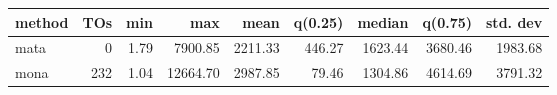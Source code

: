 \begin{tabular}{lrrrrrrrr}
\hline
 method   &    TOs &   min &      max &    mean &   q(0.25) &   median &   q(0.75) &   std. dev \\
\hline
 mata     &   0 &  1.79 &  7900.85 & 2211.33 &    446.27 &  1623.44 &   3680.46 &    1983.68 \\
 mona     & 232 &  1.04 & 12664.70 & 2987.85 &     79.46 &  1304.86 &   4614.69 &    3791.32 \\
\hline
\end{tabular}
